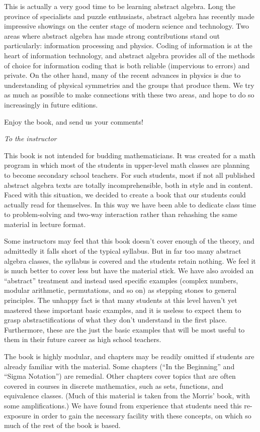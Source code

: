 This is actually a very good time to be learning abstract algebra. Long the province of specialists and puzzle enthusiasts, abstract algebra has recently made  impressive showings on the center stage of modern  science and technology. Two areas where abstract algebra has made strong contributions stand out particularly: information processing and physics. Coding of information is at the heart of information technology, and abstract algebra provides all of the methods of choice for information coding that is both reliable (impervious to errors) and private.  
On the other hand,  many of the recent advances in  physics is due to understanding of physical symmetries and the groups that produce them. We try as much as possible to make connections with these two areas, and hope to do so increasingly in future editions. 

Enjoy the book, and send us your comments!
\medskip

\noindent
\emph{To the instructor}
\smallskip

This book  is not intended for budding mathematicians. It was created for a math program in which most of the students in upper-level math classes are planning to become secondary school teachers. For such students, most if not all published abstract algebra texts are totally incomprehensible, both in style and in content. Faced with this situation, we decided to create a book that our students could actually read for themselves. In this way we have been able to dedicate class time to problem-solving and two-way interaction rather than rehashing the same material in lecture format.

Some instructors may feel that this book doesn't cover enough of the theory, and admittedly it falls short of the typical syllabus. But in far too many abstract algebra classes, the syllabus is covered and the students retain nothing. We feel it is much better to cover less but have the material stick. We have also avoided an ``abstract'' treatment and instead used specific examples (complex numbers, modular arithmetic, permutations, and so on) as stepping stones to general principles. The unhappy fact is that many students at this level haven't yet mastered these important basic examples, and it is useless to expect them to grasp abstractifications of what they don’t understand in the first place. Furthermore, these are the just the basic examples that will be most useful to them in their future career as high school teachers.

The book is highly modular, and chapters may be readily omitted if students are already familiar with the material. Some chapters  (``In the Beginning'' and ``Sigma Notation'') are remedial. Other chapters cover topics that are often covered in courses in discrete mathematics, such as sets, functions, and equivalence classes. (Much of this material is taken from the Morris' book, with some amplifications.) We have found from experience that students need this re-exposure in order to gain the necessary facility with these concepts, on which so much of the rest of the book is based.

